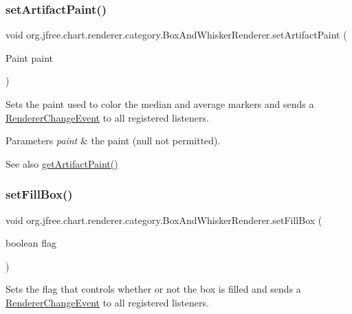 \subsubsection{\texorpdfstring{set\+Artifact\+Paint()}{setArtifactPaint()}}
{\footnotesize\ttfamily void org.\+jfree.\+chart.\+renderer.\+category.\+Box\+And\+Whisker\+Renderer.\+set\+Artifact\+Paint (\begin{DoxyParamCaption}\item[{Paint}]{paint }\end{DoxyParamCaption})}

Sets the paint used to color the median and average markers and sends a \mbox{\hyperlink{}{Renderer\+Change\+Event}} to all registered listeners.


\begin{DoxyParams}{Parameters}
{\em paint} & the paint ({\ttfamily null} not permitted).\\
\hline
\end{DoxyParams}
\begin{DoxySeeAlso}{See also}
\mbox{\hyperlink{classorg_1_1jfree_1_1chart_1_1renderer_1_1category_1_1_box_and_whisker_renderer_a1cc8be64ea3fb3a58a510028438d0e22}{get\+Artifact\+Paint()}} 
\end{DoxySeeAlso}
\mbox{\label{classorg_1_1jfree_1_1chart_1_1renderer_1_1category_1_1_box_and_whisker_renderer_ae5b3547e344c41775f7029a29807a36b}} 
\subsubsection{\texorpdfstring{set\+Fill\+Box()}{setFillBox()}}
{\footnotesize\ttfamily void org.\+jfree.\+chart.\+renderer.\+category.\+Box\+And\+Whisker\+Renderer.\+set\+Fill\+Box (\begin{DoxyParamCaption}\item[{boolean}]{flag }\end{DoxyParamCaption})}

Sets the flag that controls whether or not the box is filled and sends a \mbox{\hyperlink{}{Renderer\+Change\+Event}} to all registered listeners.


